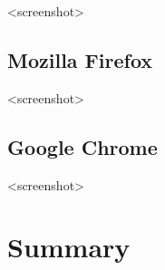 \blindtext

<screenshot>


\subsection{Mozilla Firefox}

\blindtext

<screenshot>


\subsection{Google Chrome}

\blindtext

<screenshot>










\section{Summary}

\blindtext
